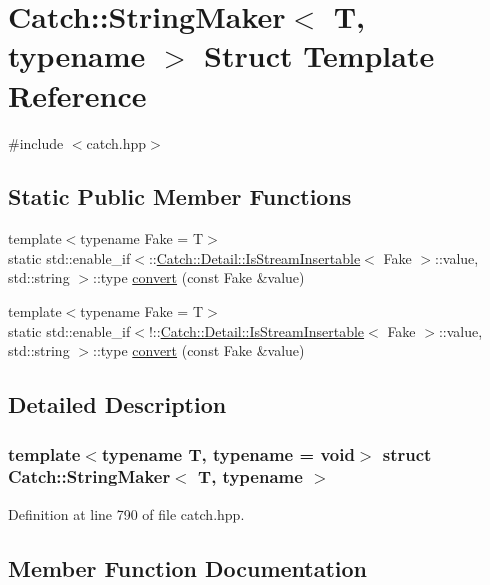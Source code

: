 \hypertarget{struct_catch_1_1_string_maker}{}\section{Catch\+:\+:String\+Maker$<$ T, typename $>$ Struct Template Reference}
\label{struct_catch_1_1_string_maker}


{\ttfamily \#include $<$catch.\+hpp$>$}

\subsection*{Static Public Member Functions}
\begin{DoxyCompactItemize}
\item 
{\footnotesize template$<$typename Fake  = T$>$ }\\static std\+::enable\+\_\+if$<$\+::\mbox{\hyperlink{class_catch_1_1_detail_1_1_is_stream_insertable}{Catch\+::\+Detail\+::\+Is\+Stream\+Insertable}}$<$ Fake $>$\+::value, std\+::string $>$\+::type \mbox{\hyperlink{struct_catch_1_1_string_maker_ab2c357e22b754802c4b1351257103eb6}{convert}} (const Fake \&value)
\item 
{\footnotesize template$<$typename Fake  = T$>$ }\\static std\+::enable\+\_\+if$<$!\+::\mbox{\hyperlink{class_catch_1_1_detail_1_1_is_stream_insertable}{Catch\+::\+Detail\+::\+Is\+Stream\+Insertable}}$<$ Fake $>$\+::value, std\+::string $>$\+::type \mbox{\hyperlink{struct_catch_1_1_string_maker_a68bb548de0e5ad364228b1ca3dd2f561}{convert}} (const Fake \&value)
\end{DoxyCompactItemize}


\subsection{Detailed Description}
\subsubsection*{template$<$typename T, typename = void$>$\newline
struct Catch\+::\+String\+Maker$<$ T, typename $>$}



Definition at line 790 of file catch.\+hpp.



\subsection{Member Function Documentation}
\mbox{\label{struct_catch_1_1_string_maker_ab2c357e22b754802c4b1351257103eb6}} 
